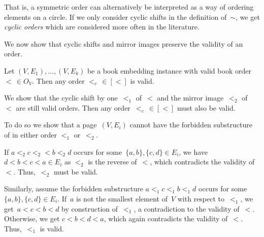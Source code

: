 That is, a symmetric order can alternatively be interpreted as a way of ordering elements on a circle.
If we only consider cyclic shifts in the definition of~$\sim$, we get \emph{cyclic orders} which are
considered more often in the literature.

We now show that cyclic shifts and mirror images preserve the validity of an order.

\begin{theorem}
\label{lemma:symmetry}
Let $(V, E_1),\dotsc, (V, E_k)$ be a book embedding instance with valid book order~$<\,\in O_V$.
Then any order $<_c\,\in [<]$ is valid.
\end{theorem}
\begin{myproof}
We show that the cyclic shift by one~$<_1$ of~$<$ and
the mirror image~$<_2$ of~$<$ are still valid orders. Then any order~$<_c\,\in [<]$ must also be valid.

To do so we show that a page~$(V, E_i)$ cannot have the forbidden substructure of  in either order $<_1$ or~$<_2$.

If $a <_2 c <_2 < b <_2 d$ occurs for some~$\{a, b\}, \{c, d\} \in E_i$, we have $d < b < c < a \in E_i$ as $<_2$ is the reverse of~$<$, which
contradicts the validity of~$<$. Thus,~$<_2$ must be valid.

Similarly, assume the forbidden substructure $a <_1 c <_1 b <_1 d$ occurs for some~$\{a, b\}, \{c, d\} \in E_i$. If~$a$ is not the smallest element of~$V$ with respect to~$<_1$, we get~$a < c < b < d$ by construction of~$<_1$, a
contradiction to the validity of~$<$. Otherwise,
we get $c < b < d < a$, which again contradicts
the validity of~$<$. Thus,~$<_1$ is valid.
\end{myproof} 
 
